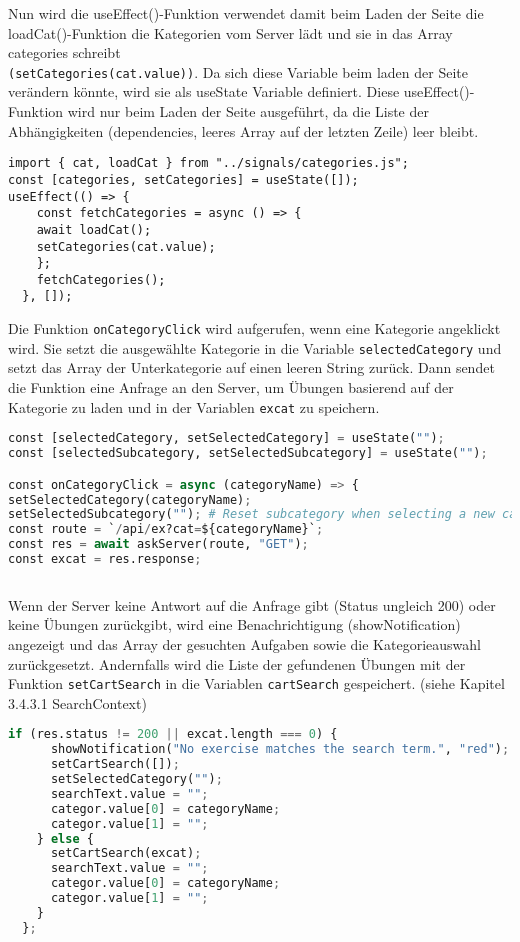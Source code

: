 Nun wird die useEffect()-Funktion verwendet damit beim Laden der Seite die loadCat()-Funktion die Kategorien vom Server lädt und sie in das Array categories schreibt \\\texttt{(setCategories(cat.value))}. Da sich diese Variable beim laden der Seite verändern könnte, wird sie als useState Variable definiert. 
Diese useEffect()-Funktion wird nur beim Laden der Seite ausgeführt, da die Liste der Abhängigkeiten (dependencies, leeres Array auf der letzten Zeile) leer bleibt. 

\begin{lstlisting}
import { cat, loadCat } from "../signals/categories.js";
const [categories, setCategories] = useState([]);
useEffect(() => {
    const fetchCategories = async () => {
    await loadCat();
    setCategories(cat.value);
    };
    fetchCategories();
  }, []);

\end{lstlisting}


Die Funktion \texttt{onCategoryClick} wird aufgerufen, wenn eine Kategorie angeklickt wird. Sie setzt die ausgewählte Kategorie in die Variable \texttt{selectedCategory} und setzt das Array der Unterkategorie auf einen leeren String zurück. Dann sendet die Funktion eine Anfrage an den Server, um Übungen basierend auf der Kategorie zu laden und in der Variablen \texttt{excat} zu speichern.

\begin{lstlisting}[language=Python]
const [selectedCategory, setSelectedCategory] = useState("");
const [selectedSubcategory, setSelectedSubcategory] = useState("");

const onCategoryClick = async (categoryName) => {
setSelectedCategory(categoryName);
setSelectedSubcategory(""); # Reset subcategory when selecting a new category
const route = `/api/ex?cat=${categoryName}`;
const res = await askServer(route, "GET");
const excat = res.response;
    
\end{lstlisting}

 Wenn der Server keine Antwort auf die Anfrage gibt (Status ungleich 200) oder keine Übungen zurückgibt, wird eine Benachrichtigung (showNotification) angezeigt und das Array der gesuchten Aufgaben sowie die Kategorieauswahl zurückgesetzt. Andernfalls wird die Liste der gefundenen Übungen mit der Funktion \texttt{setCartSearch} in die Variablen \texttt{cartSearch} gespeichert. (siehe Kapitel 3.4.3.1 SearchContext)

\newpage
\begin{lstlisting}[language=Python]
    if (res.status != 200 || excat.length === 0) {
      showNotification("No exercise matches the search term.", "red");
      setCartSearch([]);
      setSelectedCategory("");
      searchText.value = "";
      categor.value[0] = categoryName;
      categor.value[1] = "";
    } else {
      setCartSearch(excat);
      searchText.value = "";
      categor.value[0] = categoryName;
      categor.value[1] = "";
    }
  };


\end{lstlisting}



